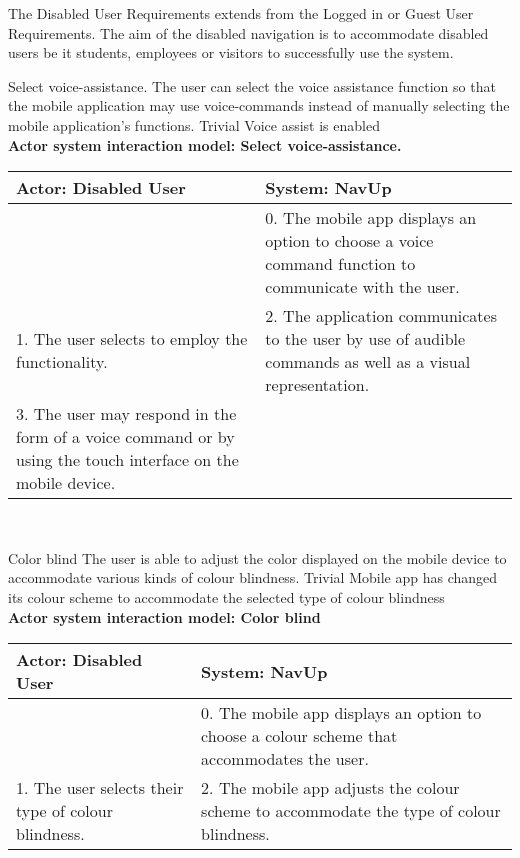 The Disabled User Requirements extends from the Logged in or Guest User Requirements. The aim of the disabled navigation is to accommodate disabled users be it students, employees or visitors to successfully use the system.

\FuncReq
{Select voice-assistance.}
{The user can select the voice assistance function so that the mobile application may use voice-commands instead of manually selecting the mobile application's functions.}
{Trivial}
{Voice assist is enabled}
    \\
    \textbf{Actor system interaction model: Select voice-assistance.}\\
    \begin{tabular}{ | p{6cm} | p{6cm} |}
    \hline
    Actor: Disabled User & System: NavUp \\ \hline
     & 0. The mobile app displays an option to choose a voice command function to communicate with the user.\\ \hline
    1. The user selects to employ the functionality. & 2. The application communicates to the user by use of audible commands as well as a visual representation.\\ \hline
    3. The user may respond in the form of a voice command or by using the touch interface on the mobile device. & \\ \hline
    
    \end{tabular}
\\
\bigskip

\FuncReq
{Color blind}
{The user is able to adjust the color displayed on the mobile device to accommodate various kinds of colour blindness.}
{Trivial}
{Mobile app has changed its colour scheme to accommodate the selected type of colour blindness}
    \\
    \textbf{Actor system interaction model: Color blind}\\
    \begin{tabular}{ | p{6cm} | p{6cm} |}
    \hline
    Actor: Disabled User & System: NavUp \\ \hline
     & 0. The mobile app displays an option to choose a colour scheme that accommodates the user.\\ \hline
    1. The user selects their type of colour blindness. & 2. The mobile app adjusts the colour scheme to accommodate the type of colour blindness.\\ \hline   
    \end{tabular}
\\
\bigskip

